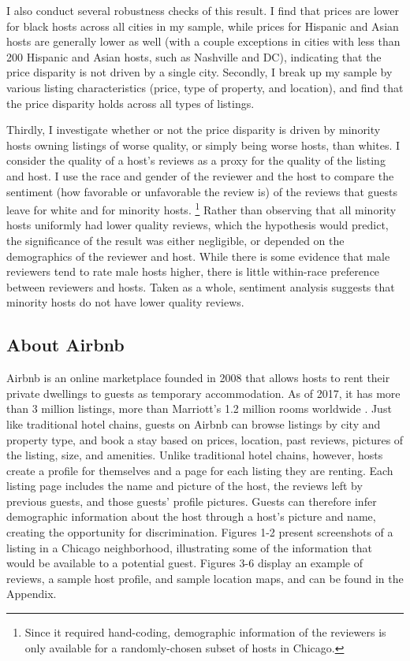 I also conduct several robustness checks of this result. I find that prices are lower for black hosts across all cities in my sample, while prices for Hispanic and Asian hosts are generally lower as well (with a couple exceptions in cities with less than 200 Hispanic and Asian hosts, such as Nashville and DC), indicating that the price disparity is not driven by a single city. Secondly, I break up my sample by various listing characteristics (price, type of property, and location), and find that the price disparity holds across all types of listings. 

Thirdly, I investigate whether or not the price disparity is driven by minority hosts owning listings of worse quality, or simply being worse hosts, than whites. I consider the quality of a host's reviews as a proxy for the quality of the listing and host. I use the race and gender of the reviewer and the host to compare the sentiment (how favorable or unfavorable the review is) of the reviews that guests leave for white and for minority hosts.%
	\footnote{Since it required hand-coding, demographic information of the reviewers is only available for a randomly-chosen subset of hosts in Chicago.} 
Rather than observing that all minority hosts uniformly had lower quality reviews, which the hypothesis would predict, the significance of the result was either negligible, or depended on the demographics of the reviewer and host. While there is some evidence that male reviewers tend to rate male hosts higher, there is little within-race preference between reviewers and hosts. Taken as a whole, sentiment analysis suggests that minority hosts do not have lower quality reviews. 

\subsection{About Airbnb} 
Airbnb is an online marketplace founded in 2008 that allows hosts to rent their private dwellings to guests as temporary accommodation. As of 2017, it has more than 3 million listings, more than Marriott's 1.2 million rooms worldwide \citep{aboutus}. Just like traditional hotel chains, guests on Airbnb can browse listings by city and property type, and book a stay based on prices, location, past reviews, pictures of the listing, size, and amenities. Unlike traditional hotel chains, however, hosts create a profile for themselves and a page for each listing they are renting. Each listing page includes the name and picture of the host, the reviews left by previous guests, and those guests' profile pictures. Guests can therefore infer demographic information about the host through a host's picture and name, creating the opportunity for discrimination. Figures 1-2 present screenshots of a listing in a Chicago neighborhood, illustrating some of the information that would be available to a potential guest. Figures 3-6 display an example of reviews, a sample host profile, and sample location maps, and can be found in the Appendix.


